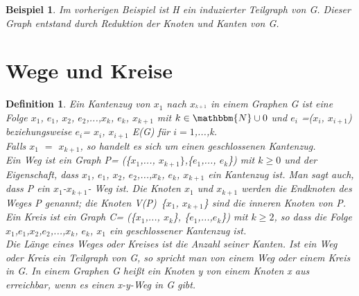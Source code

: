\documentclass{beamer}
\newtheorem{defi}[satz]{Definition}
\newtheorem{beispiel}[satz]{Beispiel}
\begin{document}
  \begin{frame}
  \vfill
    \begin{center}
      \begin {beispiel}
        Im vorherigen Beispiel ist H ein induzierter Teilgraph von G.
        Dieser Graph entstand durch Reduktion der Knoten und Kanten von G.
      \end {beispiel}
    \end{center}
  \vfill
  \end{frame}

\section{Wege und Kreise}

  \begin{frame}
  \vfill
    \begin{center}
      \begin {defi} 
        Ein Kantenzug von $x_1$ nach $x_^{k+1}$ in einem Graphen G ist eine Folge $x_1$, $e_1$, $x_2$, $e_2$,...,$x_k$, $e_k$, $x_{k+1}$ mit $k\in {\mathbbm{N}} \cup {0}$ und  $e_i$ =($x_i$, $x_{i+1}$) beziehungsweise $e_i$= {$x_i$, $x_{i+1}$} \in E(G) für $i=1$,...,k$ $.\\
        Falls  $x_1$ $=$ $x_{k+1}$, so handelt es sich um einen geschlossenen Kantenzug.\\
        Ein Weg ist ein Graph P= (\{$x_1$,..., $x_{k+1}\}$,\{$e_1$,..., $e_k$\}) mit $k\geq 0$ und der Eigenschaft, dass $x_1$, $e_1$, $x_2$, $e_2$,...,$x_k$, $e_k$, $x_{k+1}$ ein Kantenzug ist.
        Man sagt auch, dass P ein $x_1$-$x_{k+1}$- Weg ist.
        Die Knoten $x_1$ und $x_{k+1}$ werden die Endknoten des Weges P genannt; die Knoten V(P)\ \{$x_1$, $x_{k+1}$\} sind die inneren Knoten von P.\\
        Ein Kreis ist ein Graph C= (\{$x_1$,..., $x_k$\}, \{$e_1$,...,$e_k$\}) mit $k\geq 2$, so dass die Folge $x_1$,$e_1$,$x_2$,$e_2$,...,$x_k$, $e_k$, $x_1$ ein geschlossener Kantenzug ist.\\
        Die Länge eines Weges oder Kreises ist die Anzahl seiner Kanten. 
        Ist ein Weg oder Kreis ein Teilgraph von G, so spricht man von einem Weg oder einem Kreis in G.
        In einem Graphen G heißt ein Knoten y von einem Knoten x aus erreichbar, wenn es einen x-y-Weg in G gibt.
      \end{defi}
    \end{center}
  \vfill
  \end{frame}
\end{document}
